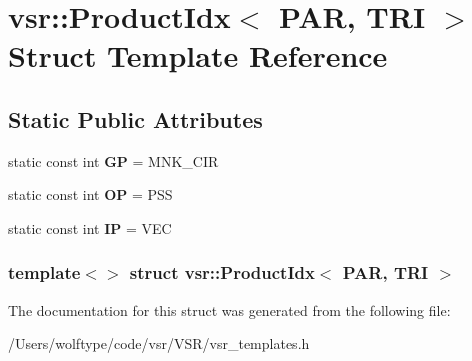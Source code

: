 \hypertarget{structvsr_1_1_product_idx_3_01_p_a_r_00_01_t_r_i_01_4}{\section{vsr\-:\-:Product\-Idx$<$ P\-A\-R, T\-R\-I $>$ Struct Template Reference}
\label{structvsr_1_1_product_idx_3_01_p_a_r_00_01_t_r_i_01_4}
}
\subsection*{Static Public Attributes}
\begin{DoxyCompactItemize}
\item 
\hypertarget{structvsr_1_1_product_idx_3_01_p_a_r_00_01_t_r_i_01_4_ac204990a54613f257fee239ddb36e096}{static const int {\bfseries G\-P} = M\-N\-K\-\_\-\-C\-I\-R}\label{structvsr_1_1_product_idx_3_01_p_a_r_00_01_t_r_i_01_4_ac204990a54613f257fee239ddb36e096}

\item 
\hypertarget{structvsr_1_1_product_idx_3_01_p_a_r_00_01_t_r_i_01_4_a1499f72c867571aa05dedd795e39ed6a}{static const int {\bfseries O\-P} = P\-S\-S}\label{structvsr_1_1_product_idx_3_01_p_a_r_00_01_t_r_i_01_4_a1499f72c867571aa05dedd795e39ed6a}

\item 
\hypertarget{structvsr_1_1_product_idx_3_01_p_a_r_00_01_t_r_i_01_4_aeb88ebbc2084144eeb7b5f99987dfd8f}{static const int {\bfseries I\-P} = V\-E\-C}\label{structvsr_1_1_product_idx_3_01_p_a_r_00_01_t_r_i_01_4_aeb88ebbc2084144eeb7b5f99987dfd8f}

\end{DoxyCompactItemize}
\subsubsection*{template$<$$>$ struct vsr\-::\-Product\-Idx$<$ P\-A\-R, T\-R\-I $>$}



The documentation for this struct was generated from the following file\-:\begin{DoxyCompactItemize}
\item 
/\-Users/wolftype/code/vsr/\-V\-S\-R/vsr\-\_\-templates.\-h\end{DoxyCompactItemize}
